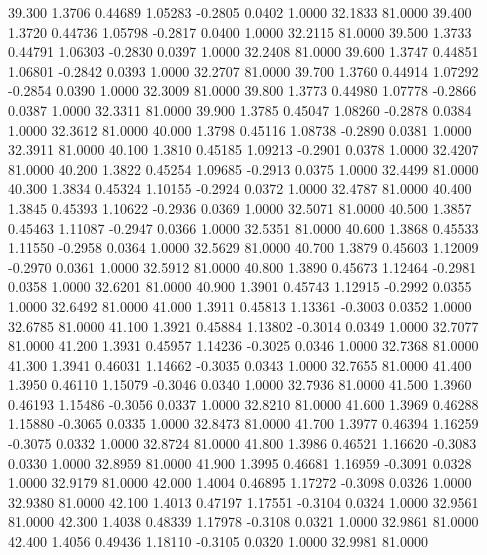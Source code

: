   39.300   1.3706   0.44689   1.05283  -0.2805   0.0402   1.0000  32.1833  81.0000
  39.400   1.3720   0.44736   1.05798  -0.2817   0.0400   1.0000  32.2115  81.0000
  39.500   1.3733   0.44791   1.06303  -0.2830   0.0397   1.0000  32.2408  81.0000
  39.600   1.3747   0.44851   1.06801  -0.2842   0.0393   1.0000  32.2707  81.0000
  39.700   1.3760   0.44914   1.07292  -0.2854   0.0390   1.0000  32.3009  81.0000
  39.800   1.3773   0.44980   1.07778  -0.2866   0.0387   1.0000  32.3311  81.0000
  39.900   1.3785   0.45047   1.08260  -0.2878   0.0384   1.0000  32.3612  81.0000
  40.000   1.3798   0.45116   1.08738  -0.2890   0.0381   1.0000  32.3911  81.0000
  40.100   1.3810   0.45185   1.09213  -0.2901   0.0378   1.0000  32.4207  81.0000
  40.200   1.3822   0.45254   1.09685  -0.2913   0.0375   1.0000  32.4499  81.0000
  40.300   1.3834   0.45324   1.10155  -0.2924   0.0372   1.0000  32.4787  81.0000
  40.400   1.3845   0.45393   1.10622  -0.2936   0.0369   1.0000  32.5071  81.0000
  40.500   1.3857   0.45463   1.11087  -0.2947   0.0366   1.0000  32.5351  81.0000
  40.600   1.3868   0.45533   1.11550  -0.2958   0.0364   1.0000  32.5629  81.0000
  40.700   1.3879   0.45603   1.12009  -0.2970   0.0361   1.0000  32.5912  81.0000
  40.800   1.3890   0.45673   1.12464  -0.2981   0.0358   1.0000  32.6201  81.0000
  40.900   1.3901   0.45743   1.12915  -0.2992   0.0355   1.0000  32.6492  81.0000
  41.000   1.3911   0.45813   1.13361  -0.3003   0.0352   1.0000  32.6785  81.0000
  41.100   1.3921   0.45884   1.13802  -0.3014   0.0349   1.0000  32.7077  81.0000
  41.200   1.3931   0.45957   1.14236  -0.3025   0.0346   1.0000  32.7368  81.0000
  41.300   1.3941   0.46031   1.14662  -0.3035   0.0343   1.0000  32.7655  81.0000
  41.400   1.3950   0.46110   1.15079  -0.3046   0.0340   1.0000  32.7936  81.0000
  41.500   1.3960   0.46193   1.15486  -0.3056   0.0337   1.0000  32.8210  81.0000
  41.600   1.3969   0.46288   1.15880  -0.3065   0.0335   1.0000  32.8473  81.0000
  41.700   1.3977   0.46394   1.16259  -0.3075   0.0332   1.0000  32.8724  81.0000
  41.800   1.3986   0.46521   1.16620  -0.3083   0.0330   1.0000  32.8959  81.0000
  41.900   1.3995   0.46681   1.16959  -0.3091   0.0328   1.0000  32.9179  81.0000
  42.000   1.4004   0.46895   1.17272  -0.3098   0.0326   1.0000  32.9380  81.0000
  42.100   1.4013   0.47197   1.17551  -0.3104   0.0324   1.0000  32.9561  81.0000
  42.300   1.4038   0.48339   1.17978  -0.3108   0.0321   1.0000  32.9861  81.0000
  42.400   1.4056   0.49436   1.18110  -0.3105   0.0320   1.0000  32.9981  81.0000
